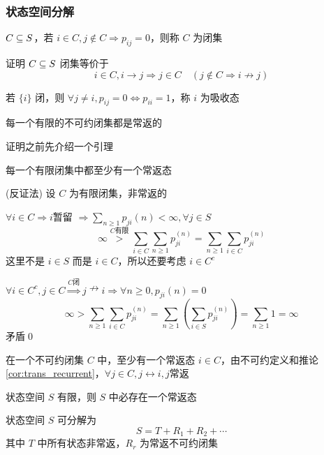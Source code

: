 \subsubsection{状态空间分解}
\begin{definition}[闭集]
    $C\subseteq S$，若 $i\in C,j\notin C\Rightarrow p_{ij}=0$，则称 $C$ 为闭集
\end{definition}

\begin{problem}[作业6-3]
    证明 $C\subseteq S$ 闭集等价于
    \[
    i\in C,i\to j\Rightarrow j\in C\quad (j\notin C\Rightarrow i\nrightarrow j)
    \]
\end{problem}

\begin{example}
    若 $\{i\}$ 闭，则 $\forall j\neq i,p_{ij}=0\Leftrightarrow p_{ii}=1$，称 $i$ 为吸收态
\end{example}

\begin{theorem}
    每一个有限的不可约闭集都是常返的
\end{theorem}

证明之前先介绍一个引理

\begin{lemma}
    每一个有限闭集中都至少有一个常返态
\end{lemma}

(反证法) 设 $C$ 为有限闭集，非常返的

$\forall i\in C\Rightarrow i$暂留 $\Rightarrow \sum_{n\geq 1}p_{ji}(n)<\infty,\forall j\in S$
\[
\infty\overset{C\text{有限}}{>}\sum_{i\in C}\sum_{n\geq 1}p_{ji}^{(n)}=\sum_{n\geq 1}\sum_{i\in C}p_{ji}^{(n)}
\]
这里不是 $i\in S$ 而是 $i\in C$，所以还要考虑 $i\in C^c$

$\forall i\in C^c,j\in C\overset{C\text{闭}}{\Rightarrow}j\nrightarrow i \Rightarrow \forall n\geq 0,p_{ji}(n)=0$
\[
\infty>\sum_{n\geq 1}\sum_{i\in C}p_{ji}^{(n)}=\sum_{n\geq 1}\left(\sum_{i\in S}p_{ji}^{(n)}\right)=\sum_{n\geq 1}1=\infty
\]
矛盾\qed

在一个不可约闭集 $C$ 中，至少有一个常返态 $i\in C$，由不可约定义和推论\ref{cor:trans_recurrent}，$\forall j\in C,j\leftrightarrow i,j$常返

\begin{corollary}
    状态空间 $S$ 有限，则 $S$ 中必存在一个常返态
\end{corollary}

\begin{theorem}[分解定理]
    状态空间 $S$ 可分解为
    \[
    S=T+R_1+R_2+\cdots
    \]
    其中 $T$ 中所有状态非常返，$R_r$ 为常返不可约闭集
\end{theorem}

